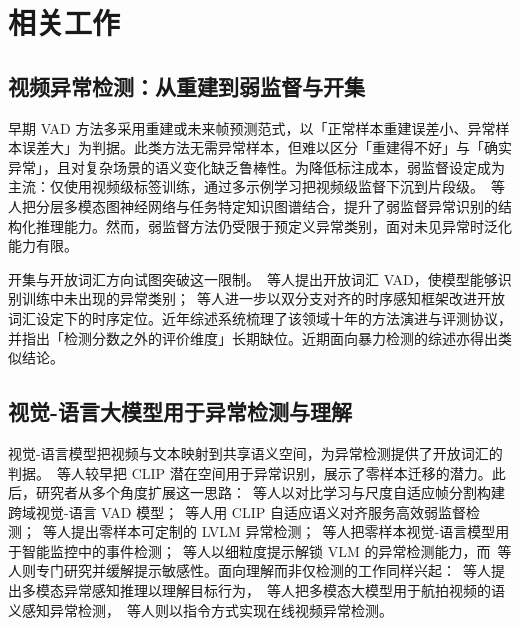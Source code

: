 \section{相关工作}
\label{sec:related}

\subsection{视频异常检测：从重建到弱监督与开集}

早期 VAD 方法多采用重建或未来帧预测范式，以「正常样本重建误差小、异常样本误差大」为判据。此类方法无需异常样本，但难以区分「重建得不好」与「确实异常」，且对复杂场景的语义变化缺乏鲁棒性。为降低标注成本，弱监督设定成为主流：仅使用视频级标签训练，通过多示例学习把视频级监督下沉到片段级。\citeauthor{yun2025missiongnn}~等人把分层多模态图神经网络与任务特定知识图谱结合，提升了弱监督异常识别的结构化推理能力\cite{yun2025missiongnn}。然而，弱监督方法仍受限于预定义异常类别，面对未见异常时泛化能力有限。

开集与开放词汇方向试图突破这一限制。\citeauthor{wu2024openvocab}~等人提出开放词汇 VAD，使模型能够识别训练中未出现的异常类别\cite{wu2024openvocab}；\citeauthor{kim2026dtvad}~等人进一步以双分支对齐的时序感知框架改进开放词汇设定下的时序定位\cite{kim2026dtvad}。近年综述系统梳理了该领域十年的方法演进与评测协议\cite{abdalla2025vad10years,pravalika2026surveillance}，并指出「检测分数之外的评价维度」长期缺位。近期面向暴力检测的综述亦得出类似结论\cite{houssein2026violence}。

\subsection{视觉-语言大模型用于异常检测与理解}

视觉-语言模型把视频与文本映射到共享语义空间，为异常检测提供了开放词汇的判据。\citeauthor{zanella2024clip}~等人较早把 CLIP 潜在空间用于异常识别，展示了零样本迁移的潜力\cite{zanella2024clip}。此后，研究者从多个角度扩展这一思路：\citeauthor{biswas2025mmvad}~等人以对比学习与尺度自适应帧分割构建跨域视觉-语言 VAD 模型\cite{biswas2025mmvad}；\citeauthor{kang2025clipalign}~等人用 CLIP 自适应语义对齐服务高效弱监督检测\cite{kang2025clipalign}；\citeauthor{ahn2026anyanomaly}~等人提出零样本可定制的 LVLM 异常检测\cite{ahn2026anyanomaly}；\citeauthor{kebour2025zeroshot}~等人把零样本视觉-语言模型用于智能监控中的事件检测\cite{kebour2025zeroshot}；\citeauthor{zou2026prompting}~等人以细粒度提示解锁 VLM 的异常检测能力\cite{zou2026prompting}，而\citeauthor{ignatosyan2026prompt}~等人则专门研究并缓解提示敏感性\cite{ignatosyan2026prompt}。面向理解而非仅检测的工作同样兴起：\citeauthor{zhou2026targetvau}~等人提出多模态异常感知推理以理解目标行为\cite{zhou2026targetvau}，\citeauthor{li2026aerial}~等人把多模态大模型用于航拍视频的语义感知异常检测\cite{li2026aerial}，\citeauthor{yang2025monitor}~等人则以指令方式实现在线视频异常检测\cite{yang2025monitor}。

